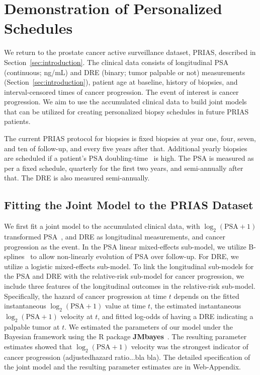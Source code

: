 \section{Demonstration of Personalized Schedules}
\label{sec:results}
We return to the prostate cancer active surveillance dataset, PRIAS, described in Section~\ref{sec:introduction}. The clinical data consists of longitudinal PSA (continuous; ng/mL) and DRE (binary; tumor palpable or not) measurements (Section~\ref{sec:introduction}), patient age at baseline, history of biopsies, and interval-censored times of cancer progression. The event of interest is cancer progression. We aim to use the accumulated clinical data to build joint models that can be utilized for creating personalized biopsy schedules in future PRIAS patients. 

The current PRIAS protocol for biopsies is fixed biopsies at year one, four, seven, and ten of follow-up, and every five years after that. Additional yearly biopsies are scheduled if a patient's PSA doubling-time~\citep{bokhorst2015compliance} is high. The PSA is measured as per a fixed schedule, quarterly for the first two years, and semi-annually after that. The DRE is also measured semi-annually.

\subsection{Fitting the Joint Model to the PRIAS Dataset}
We first fit a joint model to the accumulated clinical data, with $\log_2(\mbox{PSA} + 1)$ transformed PSA~\citep{lin2000latent,pearson1994mixed}, and DRE as longitudinal measurements, and cancer progression as the event. In the PSA linear mixed-effects sub-model, we utilize B-splines~\citep{de1978practical} to allow non-linearly evolution of PSA over follow-up. For DRE, we utilize a logistic mixed-effects sub-model. To link the longitudinal sub-models for the PSA and DRE with the relative-risk sub-model for cancer progression, we include three features of the longitudinal outcomes in the relative-risk sub-model. Specifically, the hazard of cancer progression at time $t$ depends on the fitted instantaneous $\log_2(\mbox{PSA} + 1)$ value at time $t$, the estimated instantaneous $\log_2(\mbox{PSA} + 1)$ velocity at $t$, and fitted log-odds of having a DRE indicating a palpable tumor at $t$. We estimated the parameters of our model under the Bayesian framework using the R package \textbf{JMbayes}~\citep{rizopoulosJMbayes}. The resulting parameter estimates showed that $\log_2(\mbox{PSA} + 1)$ velocity was the strongest indicator of cancer progression (adjustedhazard ratio...bla bla). The detailed specification of the joint model and the resulting parameter estimates are in Web-Appendix.

